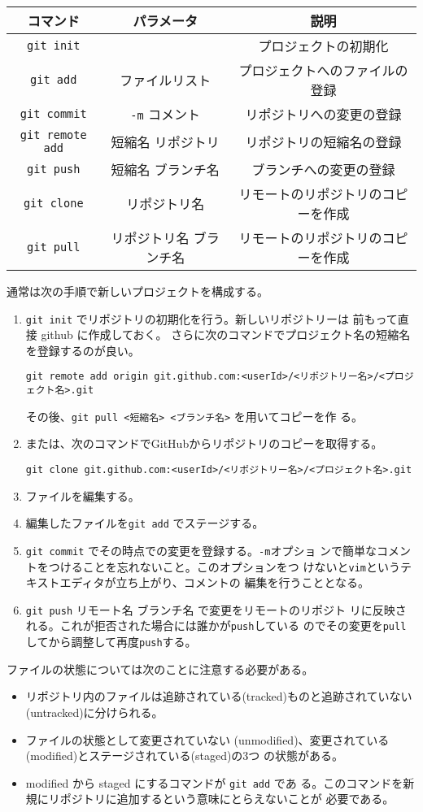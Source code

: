\begin{tabular}{|c|c|c|}\hline
コマンド&パラメータ&説明\\\hline
\Verb+git init+ & &プロジェクトの初期化\\\hline
\Verb+git add+ & ファイルリスト&プロジェクトへのファイルの登録 \\\hline
\Verb+git commit+& \Verb+-m+ コメント& リポジトリへの変更の登録\\ \hline
\Verb+git remote add+ &短縮名 リポジトリ & リポジトリの短縮名の登録\\
 \hline
\Verb+git push+ & 短縮名 ブランチ名 &ブランチへの変更の登録 \\ \hline
\Verb+git clone+ &リポジトリ名 &リモートのリポジトリのコピーを作成\\ \hline
\Verb+git pull+ &リポジトリ名 ブランチ名 &リモートのリポジトリのコピーを作成\\ \hline
\end{tabular}

通常は次の手順で新しいプロジェクトを構成する。
\begin{enumerate}
 \item \Verb+git init+ でリポジトリの初期化を行う。新しいリポジトリーは
			 前もって直接 github に作成しておく。
       さらに次のコマンドでプロジェクト名の短縮名を登録するのが良い。

 \Verb+git remote add origin git.github.com:<userId>/<リポジトリー名>/<プロジェクト名>.git+

       その後、\Verb+git pull <短縮名> <ブランチ名>+ を用いてコピーを作
       る。
 \item または、次のコマンドでGitHubからリポジトリのコピーを取得する。
       
   \Verb+git clone git.github.com:<userId>/<リポジトリー名>/<プロジェクト名>.git+
 \item ファイルを編集する。
 \item 編集したファイルを\Verb+git add+ でステージする。
 \item \Verb+git commit+ でその時点での変更を登録する。\Verb+-m+オプショ
			 ンで簡単なコメントをつけることを忘れないこと。このオプションをつ
			 けないと\Verb+vim+というテキストエディタが立ち上がり、コメントの
			 編集を行うこととなる。
 \item \Verb+git push+ リモート名 ブランチ名 で変更をリモートのリポジト
			 リに反映される。これが拒否された場合には誰かが\Verb+push+している
			 のでその変更を\Verb+pull+してから調整して再度\Verb+push+する。
\end{enumerate}
ファイルの状態については次のことに注意する必要がある。
\begin{itemize}
 \item リポジトリ内のファイルは追跡されている(tracked)ものと追跡されていない
(untracked)に分けられる。
 \item ファイルの状態として変更されていない
(unmodified)、変更されている(modified)とステージされている(staged)の3つ
の状態がある。
 \item modified から staged にするコマンドが \Verb+git add+ であ
る。このコマンドを新規にリポジトリに追加するという意味にとらえないことが
必要である。
\end{itemize}

